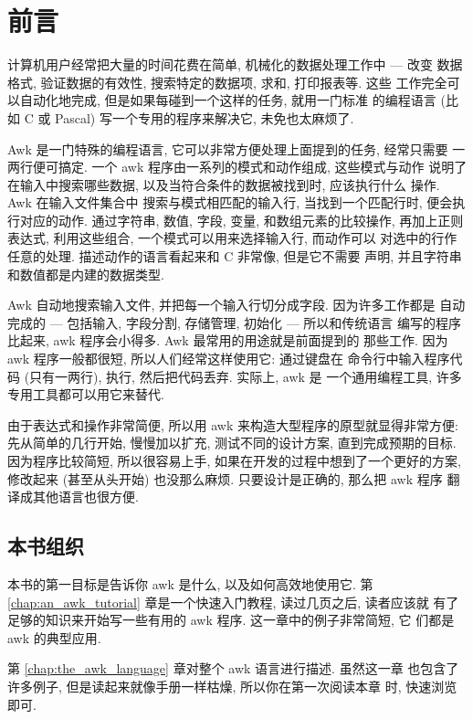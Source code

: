 \chapter{前言}
\label{chap:preface}

计算机用户经常把大量的时间花费在简单, 机械化的数据处理工作中 --- 改变
数据格式, 验证数据的有效性, 搜索特定的数据项, 求和, 打印报表等. 这些
工作完全可以自动化地完成, 但是如果每碰到一个这样的任务, 就用一门标准
的编程语言 (比如 C 或 Pascal) 写一个专用的程序来解决它, 未免也太麻烦了.

Awk 是一门特殊的编程语言, 它可以非常方便处理上面提到的任务, 经常只需要
一两行便可搞定. 一个 awk 程序由一系列的模式和动作组成, 这些模式与动作
说明了在输入中搜索哪些数据, 以及当符合条件的数据被找到时, 应该执行什么
操作. Awk 在输入文件集合中 搜索与模式相匹配的输入行, 当找到一个匹配行时, 
便会执行对应的动作. 通过字符串, 数值, 字段, 变量, 和数组元素的比较操作,
再加上正则表达式, 利用这些组合, 一个模式可以用来选择输入行, 而动作可以
对选中的行作任意的处理. 描述动作的语言看起来和 C 非常像, 但是它不需要
声明, 并且字符串和数值都是内建的数据类型.

Awk 自动地搜索输入文件, 并把每一个输入行切分成字段. 因为许多工作都是
自动完成的 --- 包括输入, 字段分割, 存储管理, 初始化 --- 所以和传统语言
编写的程序比起来, awk 程序会小得多. Awk 最常用的用途就是前面提到的
那些工作. 因为 awk 程序一般都很短, 所以人们经常这样使用它: 通过键盘在
命令行中输入程序代码 (只有一两行), 执行, 然后把代码丢弃. 实际上, awk 是
一个通用编程工具, 许多专用工具都可以用它来替代.

由于表达式和操作非常简便, 所以用 awk 来构造大型程序的原型就显得非常方便:
先从简单的几行开始, 慢慢加以扩充, 测试不同的设计方案, 直到完成预期的目标.
因为程序比较简短, 所以很容易上手, 如果在开发的过程中想到了一个更好的方案,
修改起来 (甚至从头开始) 也没那么麻烦. 只要设计是正确的, 那么把 awk 程序
翻译成其他语言也很方便.

\section*{本书组织}
本书的第一目标是告诉你 awk 是什么, 以及如何高效地使用它. 第 
\ref{chap:an_awk_tutorial} 章是一个快速入门教程, 读过几页之后, 读者应该就
有了足够的知识来开始写一些有用的 awk 程序. 这一章中的例子非常简短, 它
们都是 awk 的典型应用.

第 \ref{chap:the_awk_language} 章对整个 awk 语言进行描述. 虽然这一章
也包含了许多例子, 但是读起来就像手册一样枯燥, 所以你在第一次阅读本章
时, 快速浏览即可.

